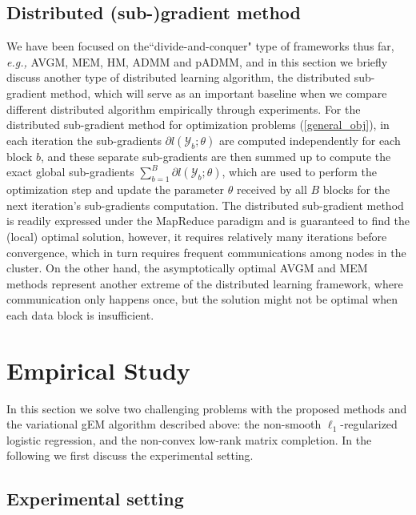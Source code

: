 \documentclass{article}
\newcommand{\eg}[0]{\emph{e.g., }}
\newcommand{\1}[0]{\ensuremath{\boldsymbol{1}}\xspace}
\begin{document}
\subsection{Distributed (sub-)gradient method}
We have been focused on the``divide-and-conquer" type of frameworks thus far, \eg AVGM, MEM, HM, ADMM and pADMM, and in this section we briefly discuss another type of distributed learning algorithm, the distributed sub-gradient method, which will serve as an important baseline when we compare different distributed algorithm empirically through experiments. For the distributed sub-gradient method for optimization problems (\ref{general_obj}), in each iteration the sub-gradients $\partial l(\mathcal{Y}_b; \theta)$ are computed independently for each block $b$, and these separate sub-gradients are then summed up to compute the exact global sub-gradients $\textstyle\sum_{b=1}^B\partial l(\mathcal{Y}_b; \theta)$, which are used to perform the optimization step and update the parameter $\theta$ received by all $B$ blocks for the next iteration's sub-gradients computation. The distributed sub-gradient method is readily expressed under the MapReduce paradigm \cite{Dean2004} and is guaranteed to find the (local) optimal solution, however, it requires relatively many iterations before convergence, which in turn requires frequent communications among nodes in the cluster. On the other hand, the asymptotically optimal AVGM and MEM methods represent another extreme of the distributed learning framework, where communication only happens once, but the solution might not be optimal when each data block is insufficient. 


\section{Empirical Study}
In this section we solve two challenging problems with the proposed methods and the variational gEM algorithm described above: the non-smooth $\ell_1$-regularized logistic regression, and the non-convex low-rank matrix completion. In the following we first discuss the experimental setting.

\subsection{Experimental setting}
\end{document}
